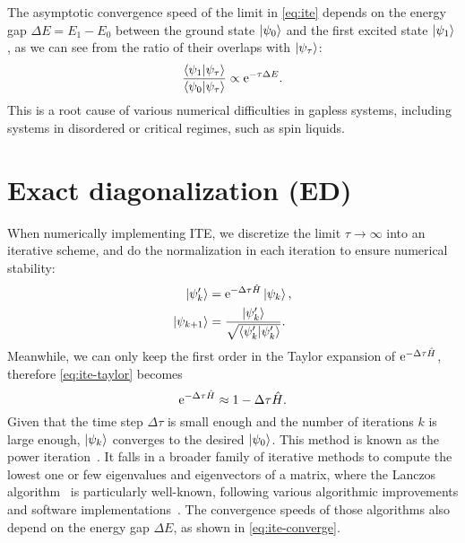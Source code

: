 The asymptotic convergence speed of the limit in \cref{eq:ite} depends on the energy gap $\Delta E = E_1 - E_0$ between the ground state $\ket{\psi_0}$ and the first excited state $\ket{\psi_1}$, as we can see from the ratio of their overlaps with $\ket{\psi_\tau}$:
\begin{equation}
\frac{\ip{\psi_1}{\psi_\tau}}{\ip{\psi_0}{\psi_\tau}} \propto \rme^{-\tau \Delta E}. \label{eq:ite-converge}
\end{equation}
This is a root cause of various numerical difficulties in gapless systems, including systems in disordered or critical regimes, such as spin liquids.

\section{Exact diagonalization (ED)}
\label{sec:ed}

When numerically implementing ITE, we discretize the limit $\tau \to \infty$ into an iterative scheme, and do the normalization in each iteration to ensure numerical stability:
\begin{align}
\ket{\psi'_k} &= \rme^{-\Delta \tau \hat{H}} \ket{\psi_k}, \\
\ket{\psi_{k + 1}} &= \frac{\ket{\psi'_k}}{\sqrt{\ip{\psi'_k}}}.
\end{align}
Meanwhile, we can only keep the first order in the Taylor expansion of $\mathrm{e}^{-\Delta \tau \hat{H}}$, therefore \cref{eq:ite-taylor} becomes
\begin{equation}
\mathrm{e}^{-\Delta \tau \hat{H}} \approx 1 - \Delta \tau \hat{H}.
\end{equation}
Given that the time step $\Delta \tau$ is small enough and the number of iterations $k$ is large enough, $\ket{\psi_k}$ converges to the desired $\ket{\psi_0}$. This method is known as the power iteration~\cite{mises1929praktische}. It falls in a broader family of iterative methods to compute the lowest one or few eigenvalues and eigenvectors of a matrix, where the Lanczos algorithm~\cite{lanczos1950iteration} is particularly well-known, following various algorithmic improvements and software implementations~\cite{knyazev2001toward, stathopoulos2010primme}. The convergence speeds of those algorithms also depend on the energy gap $\Delta E$, as shown in \cref{eq:ite-converge}.

